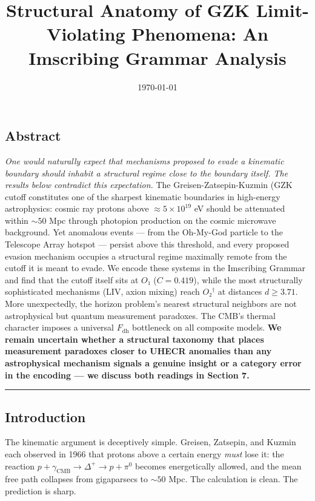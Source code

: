 \documentclass[12pt,a4paper]{article}
\begin{document}
\title{Structural Anatomy of GZK Limit-Violating Phenomena: An Imscribing Grammar Analysis}
\date{\today}

\maketitle

\subsection{Abstract}

\emph{One would naturally expect that mechanisms proposed to evade a kinematic boundary should inhabit a structural regime close to the boundary itself. The results below contradict this expectation.} The Greisen-Zatsepin-Kuzmin (GZK cutoff constitutes one of the sharpest kinematic boundaries in high-energy astrophysics: cosmic ray protons above $\approx 5 \times 10^{19}$ eV should be attenuated within $\sim 50$ Mpc through photopion production on the cosmic microwave background. Yet anomalous events --- from the Oh-My-God particle to the Telescope Array hotspot --- persist above this threshold, and every proposed evasion mechanism occupies a structural regime maximally remote from the cutoff it is meant to evade. We encode these systems in the Imscribing Grammar and find that the cutoff itself sits at $O₁$ ($C = 0.419$), while the most structurally sophisticated mechanisms (LIV, axion mixing) reach $O₂^\dagger$ at distances $d \geq 3.71$. More unexpectedly, the horizon problem's nearest structural neighbors are not astrophysical but quantum measurement paradoxes. The CMB's thermal character imposes a universal $F_{\text{dh}}$ bottleneck on all composite models. \textbf{We remain uncertain whether a structural taxonomy that places measurement paradoxes closer to UHECR anomalies than any astrophysical mechanism signals a genuine insight or a category error in the encoding --- we discuss both readings in Section 7.}

\begin{center}
\rule{0.5\textwidth}{0.4pt}
\end{center}

\subsection{Introduction}

The kinematic argument is deceptively simple. Greisen, Zatsepin, and Kuzmin each observed in 1966 that protons above a certain energy \emph{must} lose it: the reaction $p + \gamma_{\text{CMB}} \to \Delta^+ \to p + \pi^0$ becomes energetically allowed, and the mean free path collapses from gigaparsecs to $\sim 50$ Mpc. The calculation is clean. The prediction is sharp.
\end{document}
